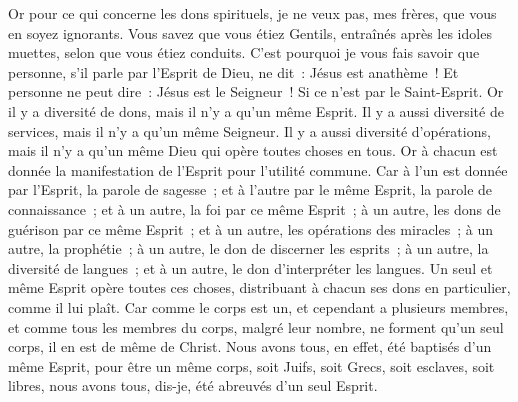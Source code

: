 \begin{multicols}{2}
\VerseOne{}Or pour ce qui concerne les dons spirituels, je ne veux pas, mes frères, que vous en soyez ignorants.
Vous savez que vous étiez Gentils, entraînés après les idoles muettes, selon que vous étiez conduits.
C'est pourquoi je vous fais savoir que personne, s'il parle par l'Esprit de Dieu, ne dit~: Jésus est anathème~! Et personne ne peut dire~: Jésus est le Seigneur~! Si ce n'est par le Saint-Esprit.
Or il y a diversité de dons, mais il n'y a qu'un même Esprit.
Il y a aussi diversité de services, mais il n'y a qu'un même Seigneur.
Il y a aussi diversité d'opérations, mais il n'y a qu'un même Dieu qui opère toutes choses en tous.
Or à chacun est donnée la manifestation de l'Esprit pour l'utilité commune.
Car à l'un est donnée par l'Esprit, la parole de sagesse~; et à l'autre par le même Esprit, la parole de connaissance~;
et à un autre, la foi par ce même Esprit~; à un autre, les dons de guérison par ce même Esprit~;
et à un autre, les opérations des miracles~; à un autre, la prophétie~; à un autre, le don de discerner les esprits~; à un autre, la diversité de langues~; et à un autre, le don d'interpréter les langues.
Un seul et même Esprit opère toutes ces choses, distribuant à chacun ses dons en particulier, comme il lui plaît.
Car comme le corps est un, et cependant a plusieurs membres, et comme tous les membres du corps, malgré leur nombre, ne forment qu'un seul corps, il en est de même de Christ.
Nous avons tous, en effet, été baptisés d'un même Esprit, pour être un même corps, soit Juifs, soit Grecs, soit esclaves, soit libres, nous avons tous, dis-je, été abreuvés d'un seul Esprit.

\end{multicols}
